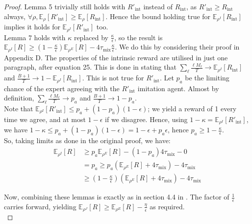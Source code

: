 \documentclass[10pt]{article} %
\theoremstyle{plain}
\theoremstyle{definition}
\theoremstyle{remark}
\begin{document}
\begin{proof}
Lemma 5 trivially still holds with $R'_\text{int}$ instead of $R_\text{int}$, as $R'_\text{int} \geq R_\text{int} $ always, $\forall \rho, \mathbb{E}_\rho[R'_\text{int}] \geq \mathbb{E}_\rho[R_\text{int}]$. Hence the bound holding true for $\mathbb{E}_{\rho^I}[R_\text{int}]$ implies it holds for $\mathbb{E}_{\rho^I}[R'_\text{int}]$ too. \\

Lemma 7 holds with $\kappa$ replaced by $\frac{\kappa}{\epsilon}$, so the result is $\mathbb{E}_{\rho^I}[R] \geq (1 - \frac{\kappa}{\epsilon})\mathbb{E}_{\rho^E}[R] - 4 \tau_{\text{mix}}\frac{\kappa}{\epsilon}$. We do this by considering their proof in Appendix D. The properties of the intrinsic reward are utilised in just one paragraph, after equation 25. This is done in stating that $\sum_\ell \frac{\ell M_\ell}{T} \rightarrow \mathbb{E}_{\rho^I}[R_\text{int}]$ and $\frac{B+1}{T} \rightarrow 1 - \mathbb{E}_{\rho^I}[R_\text{int}]$. This is not true for $R'_\text{int}$. Let $p_a$ be the limiting chance of the expert agreeing with the $R'_\text{int}$ imitation agent. Almost by definition, $\sum_\ell \frac{\ell M_\ell}{T} \rightarrow p_a$ and $\frac{B+1}{T} \rightarrow 1 - p_a$. \\

Note that $\mathbb{E}_{\rho^I}[R'_\text{int}] \leq p_a + (1-p_a)(1- \epsilon)$; we yield a reward of 1 every time we agree, and at most $1- \epsilon$ if we disagree. Hence, using $1- \kappa = \mathbb{E}_{\rho^I}[R'_\text{int}]$, we have $1- \kappa \leq p_a + (1-p_a)(1- \epsilon) = 1 - \epsilon + p_a \epsilon$, hence $p_a \geq 1 - \frac{\kappa}{\epsilon}$.\\

So, taking limits as done in the original proof, we have:
\begin{align*}
    \mathbb{E}_{\rho^I}[R] &\geq p_a \mathbb{E}_{\rho^E}[R] - (1- p_a)4\tau_\text{mix} - 0\\
    &=p_a \geq p_a (\mathbb{E}_{\rho^E}[R] +4\tau_\text{mix})  -4\tau_\text{mix}\\
    & \geq (1-\frac{\kappa}{\epsilon}) (\mathbb{E}_{\rho^E}[R] +4\tau_\text{mix})  -4\tau_\text{mix}
\end{align*}

Now,  combining these lemmas is exactly as in section 4.4 in \citet{ILbyRL}. The factor of $\frac{1}{\epsilon}$ carries forward, yielding $\mathbb{E}_{\rho^J}[R] \geq  \mathbb{E}_{\rho^E}[R] -  \frac{\eta}{\epsilon}$ as required. \\
\end{proof}
\end{document}
